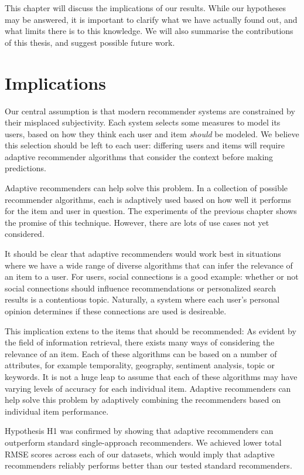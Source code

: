 \label{chap:discussion}

This chapter will discuss the implications of our results.
While our hypotheses may be answered,
it is important to clarify what we have actually found out,
and what limits there is to this knowledge.
We will also summarise the contributions of this thesis,
and suggest possible future work.


\section{Implications}      

Our central assumption is that modern recommender systems 
are constrained by their misplaced subjectivity.
Each system selects some measures to model its users, 
based on how they think each user and item \emph{should} be modeled.
We believe this selection should be left to each user:
differing users and items will require adaptive recommender algorithms that
consider the context before making predictions.

Adaptive recommenders can help solve this problem.
In a collection of possible recommender algorithms, each is adaptively used based 
on how well it performs for the item and user in question.
The experiments of the previous chapter shows the promise of this technique.
However, there are lots of use cases not yet considered.

It should be clear that adaptive recommenders would work best in situations where
we have a wide range of diverse algorithms that can infer the relevance of an item to a user.
For users, social connections is a good example: whether or not social connections should influence
recommendations or personalized search results is a contentious topic.
Naturally, a system where each user's personal opinion determines if these connections are used is desireable.

This implication extens to the items that should be recommended:
As evident by the field of information retrieval,
there exists many ways of considering the relevance of an item. 
Each of these algorithms can be based on a number of attributes, for example
temporality, geography, sentiment analysis, topic or keywords.
It is not a huge leap to assume that each of these algorithms may have
varying levels of accuracy for each individual item.
Adaptive recommenders can help solve this problem by adaptively 
combining the recommenders based on individual item performance.

Hypothesis H1 was confirmed by showing that adaptive recommenders
can outperform standard single-approach recommenders.
We achieved lower total RMSE scores across each of our datasets,
which would imply that adaptive recommenders
reliably performs better than our tested standard recommenders.

